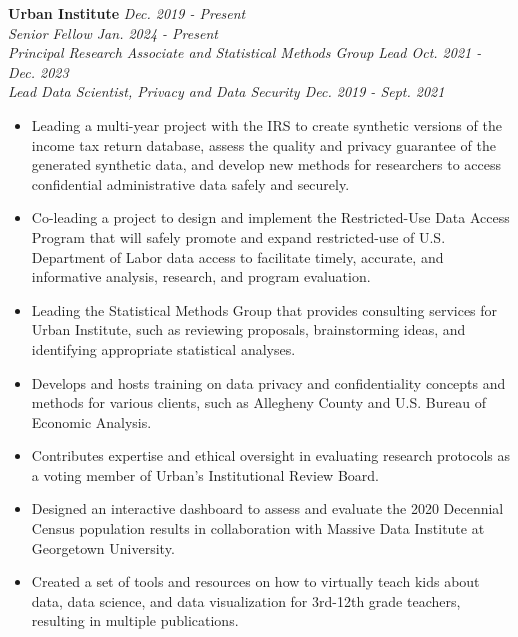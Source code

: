 
\textbf{Urban Institute} \hfill \textit{Dec. 2019 - Present}\\
    \textit{Senior Fellow \hfill Jan. 2024 - Present}\\
    \textit{Principal Research Associate and Statistical Methods Group Lead \hfill Oct. 2021 - Dec. 2023}\\
    \textit{Lead Data Scientist, Privacy and Data Security \hfill Dec. 2019 - Sept. 2021}
    \begin{itemize}
        \item Leading a multi-year project with the IRS to create synthetic versions of the income tax return database, assess the quality and privacy guarantee of the generated synthetic data, and develop new methods for researchers to access confidential administrative data safely and securely.
        \item Co-leading a project to design and implement the Restricted-Use Data Access Program that will safely promote and expand restricted-use of U.S. Department of Labor data access to facilitate timely, accurate, and informative analysis, research, and program evaluation.
        \item Leading the Statistical Methods Group that provides consulting services for Urban Institute, such as reviewing proposals, brainstorming ideas, and identifying appropriate statistical analyses.
        \item Develops and hosts training on data privacy and confidentiality concepts and methods for various clients, such as Allegheny County and U.S. Bureau of Economic Analysis.
        \item Contributes expertise and ethical oversight in evaluating research protocols as a voting member of Urban's Institutional Review Board.
        \item Designed an interactive dashboard to assess and evaluate the 2020 Decennial Census population results in collaboration with Massive Data Institute at Georgetown University.
        \item Created a set of tools and resources on how to virtually teach kids about data, data science, and data visualization for 3rd-12th grade teachers, resulting in multiple publications.
    \end{itemize}

